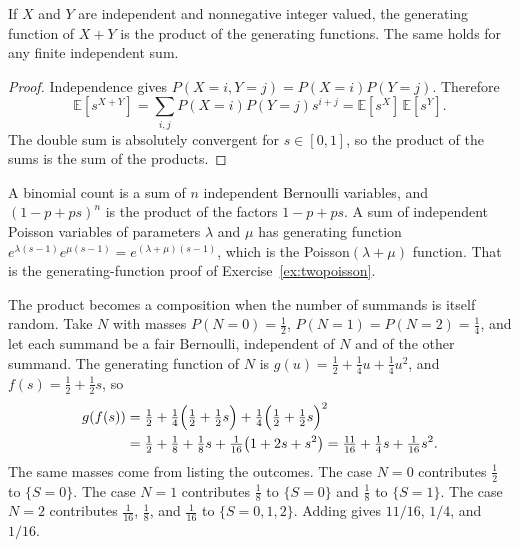 \begin{proposition}\label{prop:pgfsum}
If $X$ and $Y$ are independent and nonnegative integer valued, the generating function of $X+Y$ is the product of the generating functions. The same holds for any finite independent sum.
\end{proposition}
\begin{proof}
Independence gives $P(X=i,Y=j)=P(X=i)P(Y=j)$. Therefore
\[
 \mathbb E[s^{X+Y}]=\sum_{i,j}P(X=i)P(Y=j)s^{i+j}=\mathbb E[s^X]\,\mathbb E[s^Y].
\]
The double sum is absolutely convergent for $s\in[0,1]$, so the product of the sums is the sum of the products.
\end{proof}

A binomial count is a sum of $n$ independent Bernoulli variables, and $(1-p+ps)^n$ is the product of the factors $1-p+ps$. A sum of independent Poisson variables of parameters $\lambda$ and $\mu$ has generating function $e^{\lambda(s-1)}e^{\mu(s-1)}=e^{(\lambda+\mu)(s-1)}$, which is the Poisson$(\lambda+\mu)$ function. That is the generating-function proof of Exercise~\ref{ex:twopoisson}.

The product becomes a composition when the number of summands is itself random. Take $N$ with masses $P(N=0)=\tfrac12$, $P(N=1)=P(N=2)=\tfrac14$, and let each summand be a fair Bernoulli, independent of $N$ and of the other summand. The generating function of $N$ is $g(u)=\tfrac12+\tfrac14 u+\tfrac14 u^2$, and $f(s)=\tfrac12+\tfrac12 s$, so
\begin{align*}
 g(f(s))
 &=\tfrac12+\tfrac14\Bigl(\tfrac12+\tfrac12 s\Bigr)+\tfrac14\Bigl(\tfrac12+\tfrac12 s\Bigr)^2\\
 &=\tfrac12+\tfrac18+\tfrac18 s+\tfrac1{16}\bigl(1+2s+s^2\bigr)
 =\tfrac{11}{16}+\tfrac14 s+\tfrac1{16}s^2.
\end{align*}
The same masses come from listing the outcomes. The case $N=0$ contributes $\tfrac12$ to $\{S=0\}$. The case $N=1$ contributes $\tfrac18$ to $\{S=0\}$ and $\tfrac18$ to $\{S=1\}$. The case $N=2$ contributes $\tfrac1{16}$, $\tfrac18$, and $\tfrac1{16}$ to $\{S=0,1,2\}$. Adding gives $11/16$, $1/4$, and $1/16$.

